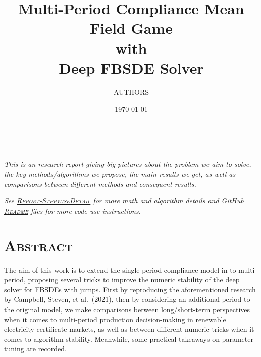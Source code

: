 \documentclass[a4paper,10pt]{article}
\newcommand{\1}{\mathbf{1}}
\begin{document}
\pagestyle{fancy}
\fancyhf{}

\title{
    \textbf{\huge
        Multi-Period Compliance Mean Field Game \\
        with \\
        Deep FBSDE Solver}}

\Large\selectfont
\medskip
\author{AUTHORS}
\date{\today}
\maketitle

\\\hline

\vspace{30pt}

\large
\textit{
This is an research report giving big pictures about the problem we aim
to solve, the key methods/algorithms we propose, the main results we
get, as well as comparisons between different methods and consequent
results.
}

\vspace{20pt}

\textit{
See \href{https://github.com/OrangeAoo/PA-MFG-FBSDE/blob/f95ab0c9c54fb68cb3517f975ac3aa2fb8b3d429/FinalReports/Report-StepwiseDetail.md}{\textsc{Report-StepwiseDetail}} for more math and algorithm details and GitHub \href{https://github.com/OrangeAoo/PA-MFG-FBSDE/blob/3cffc5e8dbe09fbc880f6c2c70d76e0b6a1b8c3c/2Period/Joint_Optim_2Prdx1/README.md}{\textsc{Readme}} files for more code use instructions.
}

\vfill
\newpage  %

\setlength{\parindent}{0pt}

\section*{\textsc{Abstract}}

\normalsize The aim of this work is to extend the single-period compliance model in \cite{SC} to
multi-period, proposing several tricks to improve the numeric stability of the deep solver for FBSDEs with jumps. First by reproducing the aforementioned research by Campbell, Steven, et al.~(2021), then by considering an additional period to the original model, we make comparisons between long/short-term perspectives when it comes to multi-period production decision-making in renewable electricity certificate markets, as well as between different numeric tricks when it comes to algorithm stability. Meanwhile, some practical takeaways on parameter-tuning are recorded.
\end{document}
